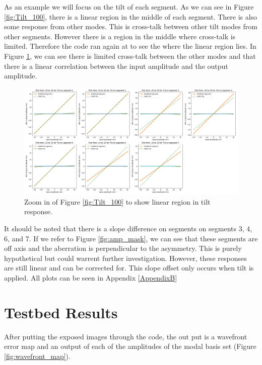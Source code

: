 As an example we will focus on the tilt of each segment.  As we can see in Figure \ref{fig:Tilt_100}, there is a linear region in the middle of each segment.  There is also some response from other modes.  This is cross-talk between other tilt modes from other segments.  However there is a region in the middle where cross-talk is limited.  Therefore the code ran again at to see the where the linear region lies.  In Figure \ref{fig:tilt30}, we can see there is limited cross-talk between the other modes and that there is a linear correlation between the input amplitude and the output amplitude.   

\begin{figure}[H]
    \centering
    \includegraphics[width = 14cm]{Figures/Tilt_response30.png}
    \caption{Zoom in of Figure \ref{fig:Tilt_100} to show linear region in tilt response.}
    \label{fig:tilt30}
\end{figure}

It should be noted that there is a slope difference on segments on segments 3, 4, 6, and 7.  If we refer to Figure \ref{fig:amp_mask}, we can see that these segments are off axis and the aberration is perpendicular to the asymmetry.  This is purely hypothetical but could warrent further investigation.  However, these responses are still linear and can be corrected for.  This slope offset only occurs when tilt is applied.  All plots can be seen in Appendix \ref{AppendixB}

\section{Testbed Results}
\label{sec:testbed}

After putting the exposed images through the code, the out put is a wavefront error map and an output of each of the amplitudes of the modal basis set (Figure \ref{fig:wavefront_map}).  

